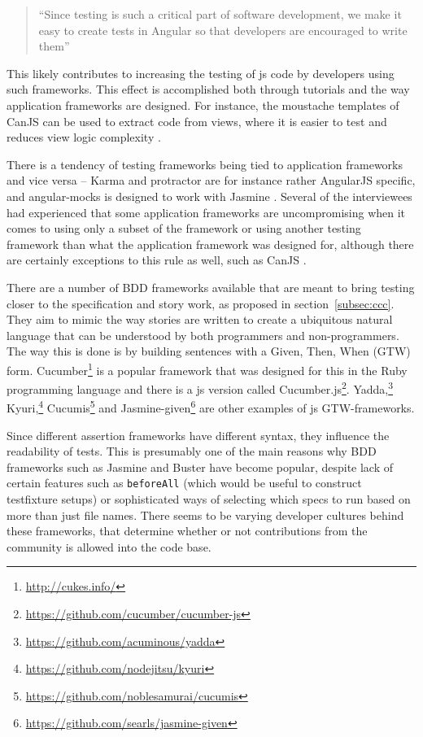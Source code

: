 \documentclass[11pt]{article}
\begin{document}
\begin{quote}
``Since testing is such a critical part of software development, we make it easy to create tests in Angular so that developers are encouraged to write them'' \cite{AngularTemplates}
\end{quote}

This likely contributes to increasing the testing of \gls{js} code by developers using such frameworks. This effect is accomplished both through tutorials and the way application frameworks are designed. For instance, the moustache templates of CanJS can be used to extract code from views, where it is easier to test and reduces view logic complexity \cite[question~32]{Ahnve}.

There is a tendency of testing frameworks being tied to application frameworks and vice versa -- Karma and protractor are for instance rather AngularJS specific, and angular-mocks is designed to work with Jasmine \cite[question~7]{Rovegard}. Several of the interviewees had experienced that some application frameworks are uncompromising when it comes to using only a subset of the framework or using another testing framework than what the application framework was designed for, although there are certainly exceptions to this rule as well, such as CanJS \cite[question~22]{Ahnve}\cite[question~41]{Rovegard}.

There are a number of BDD frameworks available that are meant to bring testing closer to the specification and story work, as proposed in section~\ref{subsec:ccc}. They aim to mimic the way stories are written to create a ubiquitous natural language that can be understood by both programmers and non-programmers. The way this is done is by building sentences with a Given, Then, When (GTW) form. Cucumber\footnote{\url{http://cukes.info/}} is a popular framework that was designed for this in the Ruby programming language and there is a \gls{js} version called Cucumber.js\footnote{\url{https://github.com/cucumber/cucumber-js}}.
Yadda,\footnote{\url{https://github.com/acuminous/yadda}}
Kyuri,\footnote{\url{https://github.com/nodejitsu/kyuri}}
Cucumis\footnote{\url{https://github.com/noblesamurai/cucumis}} and
Jasmine-given\footnote{\url{https://github.com/searls/jasmine-given}}
are other examples of \gls{js} GTW-frameworks. \cite[section 8.4]{BDDJS}

Since different assertion frameworks have different syntax, they influence the readability of tests. This is presumably one of the main reasons why BDD frameworks such as Jasmine and Buster have become popular, despite lack of certain features such as \texttt{beforeAll} (which would be useful to construct \gls{testfixture} setups) or sophisticated ways of selecting which specs to run based on more than just file names. There seems to be varying developer cultures behind these frameworks, that determine whether or not contributions from the community is allowed into the code base. \cite[question~7]{Ahnve}\cite[question~5-6]{Rovegard}
\end{document}
